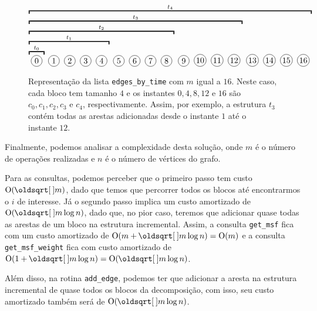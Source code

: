 \begin{figure}
    \centering
    \begin{equation*}
        \overbracket{
            \overbracket{
                \overbracket{
                    \overbracket{
                        \overbracket{
                            \bolinha{\,0\,}
                        }^{t_0}
                        \bolinha{\,1\,}
                        \bolinha{\,2\,}
                        \bolinha{\,3\,}
                        \bolinha{\,4\,}
                    }^{t_1}
                    \bolinha{\,5\,}
                    \bolinha{\,6\,}
                    \bolinha{\,7\,}
                    \bolinha{\,8\,}
                }^{t_2}
                \bolinha{\,9\,}
                \bolinha{10}
                \bolinha{11}
                \bolinha{12}
            }^{t_3}
            \bolinha{13}
            \bolinha{14}
            \bolinha{15}
            \bolinha{16}
        }^{t_4}
    \end{equation*}
    \caption{Representação da lista \texttt{edges\_by\_time} com $m$ igual a $16$. Neste caso, cada bloco tem tamanho $4$ e os instantes $0,4,8,12$ e $16$ são $c_0, c_1, c_2, c_3$ e $c_4$, respectivamente. Assim, por exemplo, a estrutura $t_3$ contém todas as arestas adicionadas desde o instante $1$ até o instante $12$.}
    \label{fig:sqrt-decomp-blocks-m16}
\end{figure}

Finalmente, podemos analisar a complexidade desta solução, onde $m$ é o número de operações realizadas e $n$ é o número de vértices do grafo.

Para as consultas, podemos perceber que o primeiro passo tem custo $\Oh(\sqrt{m})$, dado que temos que percorrer todos os blocos até encontrarmos o $i$ de interesse. Já o segundo passo implica um custo amortizado de $\Oh(\sqrt{m} \log n)$, dado que, no pior caso, teremos que adicionar quase todas as arestas de um bloco na estrutura incremental. Assim, a consulta \texttt{get\_msf} fica com um custo amortizado de $\Oh(m + \sqrt{m} \log n) = \Oh(m)$ e a consulta \texttt{get\_msf\_weight} fica com custo amortizado de $\Oh(1 + \sqrt{m} \log n) = \Oh(\sqrt{m} \log n)$.

Além disso, na rotina \texttt{add\_edge}, podemos ter que adicionar a aresta na estrutura incremental de quase todos os blocos da decomposição, com isso, seu custo amortizado também será de $\Oh(\sqrt{m} \log n)$.

